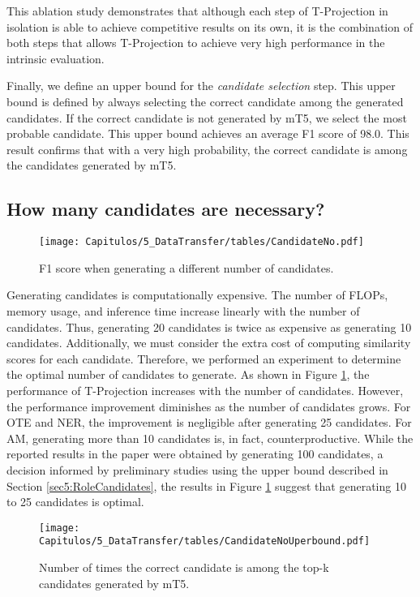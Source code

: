 This ablation study demonstrates that although each step of T-Projection in isolation is able to achieve competitive results on its own, it is the combination of both steps that allows T-Projection to achieve very high performance in the intrinsic evaluation.

Finally, we define an upper bound for the \emph{candidate selection} step. This upper bound is defined by always selecting the correct candidate among the generated candidates. If the correct candidate is not generated by mT5, we select the most probable candidate. This upper bound achieves an average F1 score of 98.0. This result confirms that with a very high probability, the correct candidate is among the candidates generated by mT5.

\subsection{How many candidates are necessary?} \label{sec5:Howmany}

\begin{figure}[htb]
    \centering
    \texttt{[image: Capitulos/5\_DataTransfer/tables/CandidateNo.pdf]}
    \caption{F1 score when generating a different number of candidates.}
    \label{fig5:CandidateNo}
\end{figure}

Generating candidates is computationally expensive. The number of FLOPs, memory usage, and inference time increase linearly with the number of candidates. Thus, generating 20 candidates is twice as expensive as generating 10 candidates. Additionally, we must consider the extra cost of computing similarity scores for each candidate. Therefore, we performed an experiment to determine the optimal number of candidates to generate. As shown in Figure \ref{fig5:CandidateNo}, the performance of T-Projection increases with the number of candidates. However, the performance improvement diminishes as the number of candidates grows. For OTE and NER, the improvement is negligible after generating 25 candidates. For AM, generating more than 10 candidates is, in fact, counterproductive. While the reported results in the paper were obtained by generating 100 candidates, a decision informed by preliminary studies using the upper bound described in Section \ref{sec5:RoleCandidates}, the results in Figure \ref{fig5:CandidateNo} suggest that generating 10 to 25 candidates is optimal.


\begin{figure}[htb]
    \centering
    \texttt{[image: Capitulos/5\_DataTransfer/tables/CandidateNoUperbound.pdf]}
    \caption{Number of times the correct candidate is among the top-k candidates generated by mT5.}
    \label{fig5:CandidateNoUpperbound}
\end{figure}

